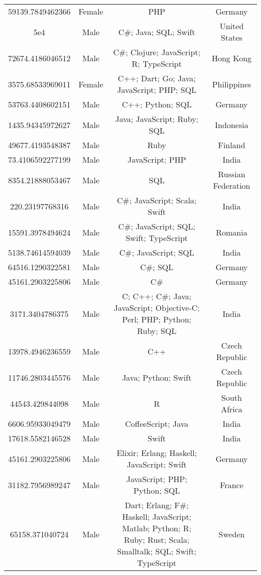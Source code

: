 \begin{center}
\begin{tabular}{ |c|c|c|c| }
59139.7849462366  &  Female  &  PHP  &  Germany  \\ 
5e4  &  Male  &  C\#; Java; SQL; Swift  &  United States  \\ 
72674.4186046512  &  Male  &  C\#; Clojure; JavaScript; R; TypeScript  &  Hong Kong  \\ 
3575.68533969011  &  Female  &  C++; Dart; Go; Java; JavaScript; PHP; SQL  &  Philippines  \\ 
53763.4408602151  &  Male  &  C++; Python; SQL  &  Germany  \\ 
1435.94345972627  &  Male  &  Java; JavaScript; Ruby; SQL  &  Indonesia  \\ 
49677.4193548387  &  Male  &  Ruby  &  Finland  \\ 
73.4106592277199  &  Male  &  JavaScript; PHP  &  India  \\ 
8354.21888053467  &  Male  &  SQL  &  Russian Federation  \\ 
220.23197768316  &  Male  &  C\#; JavaScript; Scala; Swift  &  India  \\ 
15591.3978494624  &  Male  &  C\#; JavaScript; SQL; Swift; TypeScript  &  Romania  \\ 
5138.74614594039  &  Male  &  C\#; JavaScript; SQL  &  India  \\ 
64516.1290322581  &  Male  &  C\#; SQL  &  Germany  \\ 
45161.2903225806  &  Male  &  C\#  &  Germany  \\ 
3171.3404786375  &  Male  &  C; C++; C\#; Java; JavaScript; Objective-C; Perl; PHP; Python; Ruby; SQL  &  India  \\ 
13978.4946236559  &  Male  &  C++  &  Czech Republic  \\ 
11746.2803445576  &  Male  &  Java; Python; Swift  &  Czech Republic  \\ 
44543.429844098  &  Male  &  R  &  South Africa  \\ 
6606.95933049479  &  Male  &  CoffeeScript; Java  &  India  \\ 
17618.5582146528  &  Male  &  Swift  &  India  \\ 
45161.2903225806  &  Male  &  Elixir; Erlang; Haskell; JavaScript; Swift  &  Germany  \\ 
31182.7956989247  &  Male  &  JavaScript; PHP; Python; SQL  &  France  \\ 
65158.371040724  &  Male  &  Dart; Erlang; F\#; Haskell; JavaScript; Matlab; Python; R; Ruby; Rust; Scala; Smalltalk; SQL; Swift; TypeScript  &  Sweden  \\ 

\end{tabular}
\end{center}
